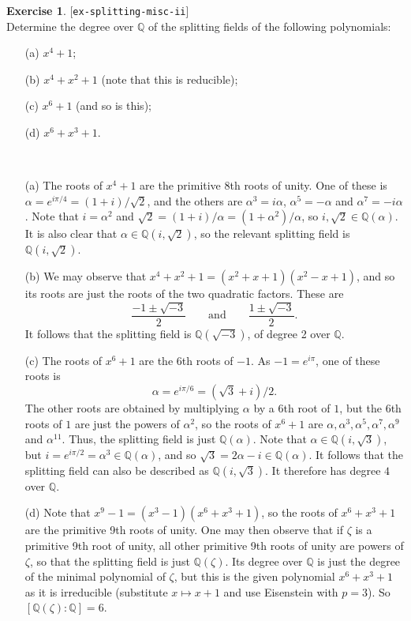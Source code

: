 \documentclass{amsart}
\newcommand{\Q}         {{\mathbb{Q}}}
\newcommand{\al}        {\alpha}
\newcommand{\zt}        {\zeta}
\renewcommand{\:}{\colon}
\newcommand{\lastexlabel}{}
\newcommand{\exlabel}[1]{
 \global\def\lastexlabel{#1}\label{#1}[\texttt{#1}]\ \\
}
\newcommand{\exlabel}[1]{
 \global\def\lastexlabel{#1}\label{#1}
}
\newenvironment{solution}{\SolutionInline}{\endSolutionInline}
\theoremstyle{definition}
\newtheorem{exercise}{Exercise}[section]
\renewenvironment{solution}{\SolutionAtEnd}{\endSolutionAtEnd}
\begin{document}
\begin{exercise}\exlabel{ex-splitting-misc-ii}
 Determine the degree over $\Q$ of the splitting fields of the
 following polynomials:
 \begin{itemize}
  \item[(a)] $x^4+1$;
  \item[(b)] $x^4+x^2+1$ (note that this is reducible);
  \item[(c)] $x^6+1$ (and so is this);
  \item[(d)] $x^6+x^3+1$.
 \end{itemize}
\end{exercise}
\begin{solution}\ \\
 \begin{itemize}
  \item[(a)] The roots of $x^4+1$ are the primitive 8th roots of unity.
   One of these is $\al=e^{i\pi/4}=(1+i)/\sqrt{2}$, and the others are
   $\al^3=i\al$, $\al^5=-\al$ and $\al^7=-i\al$.  Note that $i=\al^2$
   and $\sqrt{2}=(1+i)/\al=(1+\al^2)/\al$, so $i,\sqrt{2}\in\Q(\al)$.
   It is also clear that $\al\in\Q(i,\sqrt{2})$, so the relevant
   splitting field is $\Q(i,\sqrt{2})$.  

  \item[(b)] We may observe that $x^4+x^2+1=(x^2+x+1)(x^2-x+1)$, and
   so its roots are just the roots of the two quadratic factors. These
   are 
   \[ \frac{-1\pm\sqrt{-3}}{2} \qquad\mbox{and}\qquad
      \frac{ 1\pm\sqrt{-3}}{2}.
   \]
   It follows that the splitting field is $\Q(\sqrt{-3})$, of degree 2
   over $\Q$. 

  \item[(c)] The roots of $x^6+1$ are the 6th roots of $-1$.  As
   $-1=e^{i\pi}$, one of these roots is 
   \[ \al=e^{i\pi/6}=(\sqrt{3}+i)/2. \]
   The other roots are obtained by multiplying $\al$ by a 6th root of
   $1$, but the 6th roots of $1$ are just the powers of $\al^2$, so
   the roots of $x^6+1$ are $\al,\al^3,\al^5,\al^7,\al^9$ and
   $\al^{11}$.  Thus, the splitting field is just $\Q(\al)$.  Note
   that $\al\in\Q(i,\sqrt{3})$, but $i=e^{i\pi/2}=\al^3\in\Q(\al)$,
   and so $\sqrt{3}=2\al-i\in\Q(\al)$.  It follows that the splitting
   field can also be described as $\Q(i,\sqrt{3})$.  It therefore has
   degree $4$ over $\Q$.

  \item[(d)] Note that $x^9-1=(x^3-1)(x^6+x^3+1)$, so the roots of
   $x^6+x^3+1$ are the primitive 9th roots of unity. One may then
   observe that if $\zt$ is a primitive 9th root of unity, all other
   primitive 9th roots of unity are powers of $\zt$, so that the
   splitting field is just $\Q(\zt)$. Its degree over $\Q$ is just the
   degree of the minimal polynomial of $\zt$, but this is the given
   polynomial $x^6+x^3+1$ as it is irreducible (substitute
   $x\mapsto x+1$ and use Eisenstein with $p=3$). So $[\Q(\zt):\Q]=6$.


\end{itemize}
\end{solution}
\end{document}

